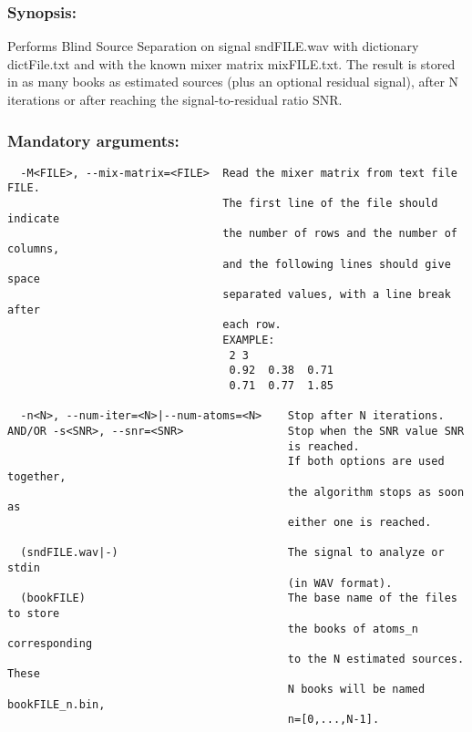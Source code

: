 \documentclass[11pt,a4paper]{article}
\begin{document}
\subsubsection*{Synopsis:}
Performs Blind Source Separation on signal sndFILE.wav with dictionary
dictFile.txt and with the known mixer matrix mixFILE.txt. The result is stored
in as many books as estimated sources (plus an optional residual signal), after
N iterations or after reaching the signal-to-residual ratio SNR.

\subsubsection*{Mandatory arguments:}
\begin{verbatim}
  -M<FILE>, --mix-matrix=<FILE>  Read the mixer matrix from text file FILE.
                                 The first line of the file should indicate
                                 the number of rows and the number of columns,
                                 and the following lines should give space
                                 separated values, with a line break after
                                 each row.
                                 EXAMPLE:
                                  2 3
                                  0.92  0.38  0.71
                                  0.71  0.77  1.85

  -n<N>, --num-iter=<N>|--num-atoms=<N>    Stop after N iterations.
AND/OR -s<SNR>, --snr=<SNR>                Stop when the SNR value SNR
                                           is reached.
                                           If both options are used together,
                                           the algorithm stops as soon as
                                           either one is reached.

  (sndFILE.wav|-)                          The signal to analyze or stdin
                                           (in WAV format).
  (bookFILE)                               The base name of the files to store
                                           the books of atoms_n corresponding
                                           to the N estimated sources. These
                                           N books will be named bookFILE_n.bin,
                                           n=[0,...,N-1].
\end{verbatim}
\end{document}
